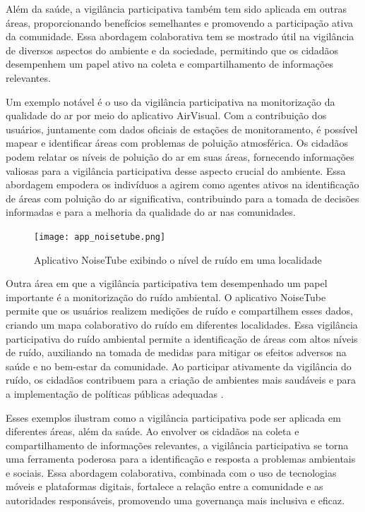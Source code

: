 Além da saúde, a vigilância participativa também tem sido aplicada em outras áreas, proporcionando benefícios semelhantes e promovendo a participação ativa da comunidade. Essa abordagem colaborativa tem se mostrado útil na vigilância de diversos aspectos do ambiente e da sociedade, permitindo que os cidadãos desempenhem um papel ativo na coleta e compartilhamento de informações relevantes.

Um exemplo notável é o uso da vigilância participativa na monitorização da qualidade do ar por meio do aplicativo AirVisual. Com a contribuição dos usuários, juntamente com dados oficiais de estações de monitoramento, é possível mapear e identificar áreas com problemas de poluição atmosférica. Os cidadãos podem relatar os níveis de poluição do ar em suas áreas, fornecendo informações valiosas para a vigilância participativa desse aspecto crucial do ambiente. Essa abordagem empodera os indivíduos a agirem como agentes ativos na identificação de áreas com poluição do ar significativa, contribuindo para a tomada de decisões informadas e para a melhoria da qualidade do ar nas comunidades.

\begin{figure}[!htb]
	\caption{Aplicativo NoiseTube exibindo o nível de ruído em uma localidade}
	\label{fig:app_noisetube}
	\centering
	\texttt{[image: app\_noisetube.png]}
\end{figure}

Outra área em que a vigilância participativa tem desempenhado um papel importante é a monitorização do ruído ambiental. O aplicativo NoiseTube permite que os usuários realizem medições de ruído e compartilhem esses dados, criando um mapa colaborativo do ruído em diferentes localidades. Essa vigilância participativa do ruído ambiental permite a identificação de áreas com altos níveis de ruído, auxiliando na tomada de medidas para mitigar os efeitos adversos na saúde e no bem-estar da comunidade. Ao participar ativamente da vigilância do ruído, os cidadãos contribuem para a criação de ambientes mais saudáveis e para a implementação de políticas públicas adequadas \cite{2010_Arnand}.

Esses exemplos ilustram como a vigilância participativa pode ser aplicada em diferentes áreas, além da saúde. Ao envolver os cidadãos na coleta e compartilhamento de informações relevantes, a vigilância participativa se torna uma ferramenta poderosa para a identificação e resposta a problemas ambientais e sociais. Essa abordagem colaborativa, combinada com o uso de tecnologias móveis e plataformas digitais, fortalece a relação entre a comunidade e as autoridades responsáveis, promovendo uma governança mais inclusiva e eficaz.

